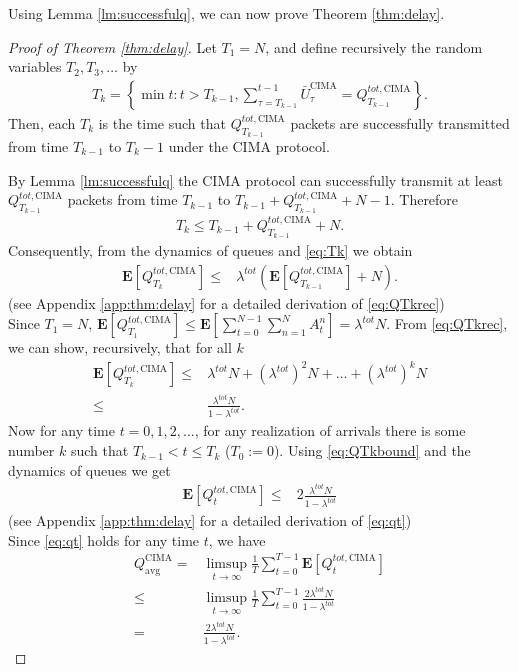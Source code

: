 \documentclass[onecolumn,draftcls]{IEEEtran}
\newcommand{\g}{\text{CIMA}}
\begin{document}
Using Lemma \ref{lm:successfulq}, we can now prove Theorem \ref{thm:delay}.

\begin{proof}[Proof of Theorem \ref{thm:delay}]
Let $T_1 = N$, and define recursively the random variables $T_2,T_3,\dots$ by
\begin{align*}
T_k = \left\{\min t: t>T_{k-1}, \sum_{\tau = T_{k-1}}^{t-1} \bar{U}^\g_{\tau} = Q^{tot,\g}_{T_{k-1}}  \right\}.
\end{align*}
Then, each $T_k$ is the time such that $Q^{tot,\g}_{T_{k-1}}$ packets are successfully transmitted
from time $T_{k-1}$ to $T_{k}-1$ under the $\g$ protocol.


By Lemma \ref{lm:successfulq} the $\g$ protocol can successfully transmit at least $Q^{tot,\g}_{T_{k-1}}$ packets from time
$T_{k-1}$ to $T_{k-1}+Q^{tot,\g}_{T_{k-1}}+N-1$. Therefore
\begin{align}
T_k \leq T_{k-1}+Q^{tot,\g}_{T_{k-1}}+N.
\label{eq:Tk}
\end{align}
Consequently, from the dynamics of queues and \eqref{eq:Tk} we obtain
\begin{align}
 \mathbf{E}\left[Q^{tot,\g}_{T_k}\right] 
\leq & \lambda^{tot}\left(\mathbf{E}\left[Q^{tot,\g}_{T_{k-1}}\right]+N\right).
\label{eq:QTkrec}
\end{align}
(see Appendix \ref{app:thm:delay} for a detailed derivation of \eqref{eq:QTkrec})
\\
Since $T_1 = N$, $\mathbf{E}\left[Q^{tot,\g}_{T_{1}}\right] 
\leq \mathbf{E}\left[\sum_{t=0}^{N-1} \sum_{n=1}^N A^n_t\right] = \lambda^{tot} N $.
From \eqref{eq:QTkrec}, we can show, recursively, that for all $k$
\begin{align}
 \mathbf{E}\left[Q^{tot,\g}_{T_k}\right] \leq &\lambda^{tot} N + (\lambda^{tot})^2 N+\dots+(\lambda^{tot})^k N \nonumber\\
                                          \leq &\frac{\lambda^{tot} N}{1-\lambda^{tot}}.
\label{eq:QTkbound}
\end{align}
Now for any time $t=0,1,2,\dots$, for any realization of arrivals there is some number $k$ such that $ T_{k-1} < t \leq T_{k} $ ($T_0:= 0$). Using \eqref{eq:QTkbound} and the dynamics of queues we get
\begin{align}
\mathbf{E}\left[Q^{tot,\g}_{t}\right] 
\leq & 2 \frac{\lambda^{tot} N}{1-\lambda^{tot}}
\label{eq:qt}
\end{align}
(see Appendix \ref{app:thm:delay} for a detailed derivation of \eqref{eq:qt})
\\
Since \eqref{eq:qt} holds for any time $t$, we have
\begin{align}
Q^\g_{\text{avg}}
= &\limsup_{t\rightarrow\infty} \frac{1}{T} \sum_{t=0}^{T-1}\mathbf{E}\left[Q^{tot,\g}_t\right] \nonumber\\
\leq & \limsup_{t\rightarrow\infty} \frac{1}{T} \sum_{t=0}^{T-1}\frac{2\lambda^{tot} N}{1-\lambda^{tot}} \nonumber\\
= & \frac{2\lambda^{tot} N}{1-\lambda^{tot}}.
\end{align}

\end{proof}
\end{document}
